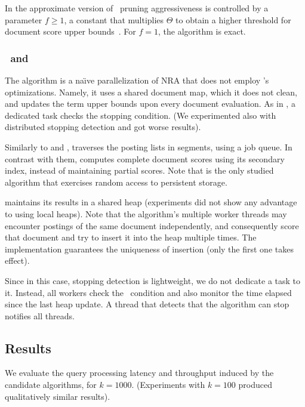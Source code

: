 In the approximate version of  \pBMW\
pruning aggressiveness is  controlled by  a parameter 
$f \geq 1$, 
a constant that multiplies $\Theta$ to obtain a higher threshold for document score upper bounds~\cite{Broder:2003}. For $f=1$, the algorithm is exact.


\subsubsection{\pRA\ and \pNRA}

The {\pNRA} algorithm is a na\"{\i}ve parallelization of NRA that does not employ \alg's optimizations. 
Namely, it uses a shared document map, which it does not clean, and updates the term
upper bounds upon every document evaluation. As in \alg, a dedicated task checks the stopping condition.
(We experimented also with distributed stopping detection and got worse results).

Similarly to {\pNRA} and \alg, {\pRA} traverses the posting lists in segments, using a job queue. 
In contrast with them, {\pRA} computes complete document scores using its secondary index, 
instead of maintaining partial scores. 
Note that {\pRA} is the only studied algorithm that exercises random access to persistent storage.  

{\pRA} maintains its results in a shared heap (experiments did not show any advantage to using local heaps).
Note that the algorithm's multiple worker threads may encounter postings of the same document independently, 
and consequently score that document and try to insert it into the heap multiple times. The implementation guarantees 
the uniqueness of insertion (only the first one takes effect).

Since in this case, stopping detection is lightweight, we do not dedicate a task to it. Instead, all workers check the  
\RAStop\ condition and also monitor the time elapsed since the last heap update.  A thread that detects that the algorithm 
can stop notifies all threads.


\subsection{Results}
\label{ssec:results}

We evaluate the query processing latency and throughput induced by the candidate algorithms, for $k=1000$.
(Experiments with $k=100$ produced qualitatively similar results).
 
